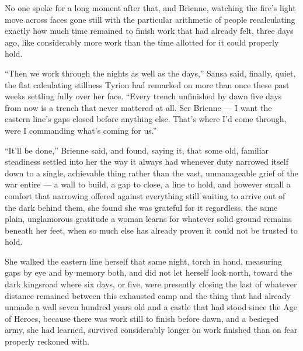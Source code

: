 No one spoke for a long moment after that, and Brienne, watching the fire’s light move across faces gone still with the particular arithmetic of people recalculating exactly how much time remained to finish work that had already felt, three days ago, like considerably more work than the time allotted for it could properly hold.

“Then we work through the nights as well as the days,” Sansa said, finally, quiet, the flat calculating stillness Tyrion had remarked on more than once these past weeks settling fully over her face. “Every trench unfinished by dawn five days from now is a trench that never mattered at all. Ser Brienne — I want the eastern line’s gaps closed before anything else. That’s where I’d come through, were I commanding what’s coming for us.”

“It’ll be done,” Brienne said, and found, saying it, that some old, familiar steadiness settled into her the way it always had whenever duty narrowed itself down to a single, achievable thing rather than the vast, unmanageable grief of the war entire — a wall to build, a gap to close, a line to hold, and however small a comfort that narrowing offered against everything still waiting to arrive out of the dark behind them, she found she was grateful for it regardless, the same plain, unglamorous gratitude a woman learns for whatever solid ground remains beneath her feet, when so much else has already proven it could not be trusted to hold.

She walked the eastern line herself that same night, torch in hand, measuring gaps by eye and by memory both, and did not let herself look north, toward the dark kingsroad where six days, or five, were presently closing the last of whatever distance remained between this exhausted camp and the thing that had already unmade a wall seven hundred years old and a castle that had stood since the Age of Heroes, because there was work still to finish before dawn, and a besieged army, she had learned, survived considerably longer on work finished than on fear properly reckoned with.
